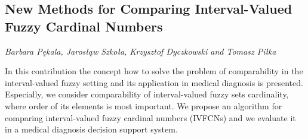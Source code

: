 \documentclass[../booklet.tex]{subfiles}
\begin{document}
\subsection[New Methods for Comparing Interval-Valued Fuzzy Cardinal Numbers. {\it Barbara Pękala, Jarosłąw Szkoła, Krzysztof Dyczkowski and Tomasz Piłka}]{New Methods for Comparing Interval-Valued Fuzzy Cardinal Numbers}
   

\begin{center}
  {\it Barbara Pękala, Jarosłąw Szkoła, Krzysztof Dyczkowski and Tomasz Piłka}
\end{center}



In this contribution the concept how to solve the problem of comparability in the interval-valued fuzzy setting and its application in medical diagnosis is presented. Especially, we consider comparability of interval-valued fuzzy sets cardinality, where order of its elements is most important.  We propose an algorithm for comparing interval-valued fuzzy cardinal numbers (IVFCNs) and we evaluate it in a medical diagnosis decision support system.

\end{document}
